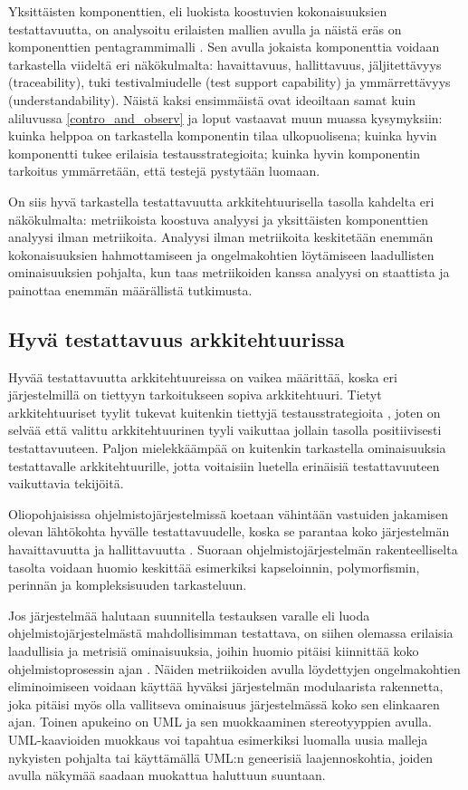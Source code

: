 \documentclass[finnish]{tktltiki2}
\numberwithin{table}{section}
\theoremstyle{definition}
\theoremstyle{remark}
\begin{document}
Yksittäisten komponenttien, eli luokista koostuvien kokonaisuuksien testattavuutta, on analysoitu erilaisten mallien avulla ja näistä eräs on komponenttien pentagrammimalli \citep{gao_component_2005}. Sen avulla jokaista komponenttia voidaan tarkastella viideltä eri näkökulmalta: havaittavuus, hallittavuus, jäljitettävyys (traceability), tuki testivalmiudelle (test support capability) ja ymmärrettävyys (understandability). Näistä kaksi ensimmäistä ovat ideoiltaan samat kuin aliluvussa \ref{contro_and_observ} ja loput vastaavat muun muassa kysymyksiin: kuinka helppoa on tarkastella komponentin tilaa ulkopuolisena; kuinka hyvin komponentti tukee erilaisia testausstrategioita; kuinka hyvin komponentin tarkoitus ymmärretään, että testejä pystytään luomaan. 
 
On siis hyvä tarkastella testattavuutta arkkitehtuurisella tasolla kahdelta eri näkökulmalta: metriikoista koostuva analyysi ja yksittäisten komponenttien analyysi ilman metriikoita. Analyysi ilman metriikoita keskitetään enemmän kokonaisuuksien hahmottamiseen ja ongelmakohtien löytämiseen laadullisten ominaisuuksien pohjalta, kun taas metriikoiden kanssa analyysi on staattista ja painottaa enemmän määrällistä tutkimusta.


\subsection{Hyvä testattavuus arkkitehtuurissa} \label{good_testability}

 
Hyvää testattavuutta arkkitehtuureissa on vaikea määrittää, koska eri järjestelmillä on tiettyyn tarkoitukseen sopiva arkkitehtuuri. Tietyt arkkitehtuuriset tyylit tukevat kuitenkin tiettyjä testausstrategioita \citep{Eickelmann:1996:MOS:243327.243602}, joten on selvää että valittu arkkitehtuurinen tyyli vaikuttaa jollain tasolla positiivisesti testattavuuteen. Paljon mielekkäämpää on kuitenkin tarkastella  ominaisuuksia testattavalle arkkitehtuurille, jotta voitaisiin luetella erinäisiä testattavuuteen vaikuttavia tekijöitä.

Oliopohjaisissa ohjelmistojärjestelmissä koetaan vähintään vastuiden jakamisen olevan lähtökohta hyvälle testattavuudelle, koska se parantaa koko järjestelmän havaittavuutta ja hallittavuutta \citep{Binder:1994:DTO:182987.184077}. Suoraan ohjelmistojärjestelmän rakenteelliselta tasolta voidaan huomio keskittää esimerkiksi kapseloinnin, polymorfismin, perinnän ja kompleksisuuden tarkasteluun. 

Jos järjestelmää halutaan suunnitella testauksen varalle eli luoda ohjelmistojärjestelmästä mahdollisimman testattava, on siihen olemassa erilaisia laadullisia ja metrisiä ominaisuuksia, joihin huomio pitäisi kiinnittää koko ohjelmistoprosessin ajan \citep{joshi_design_2014}. Näiden metriikoiden avulla löydettyjen ongelmakohtien eliminoimiseen voidaan käyttää hyväksi järjestelmän modulaarista rakennetta, joka pitäisi myös olla vallitseva ominaisuus järjestelmässä koko sen elinkaaren ajan. Toinen apukeino on UML ja sen  muokkaaminen stereotyyppien avulla. UML-kaavioiden muokkaus voi tapahtua esimerkiksi luomalla uusia malleja nykyisten pohjalta tai käyttämällä UML:n geneerisiä laajennoskohtia, joiden avulla näkymää saadaan muokattua haluttuun suuntaan.
\end{document}
